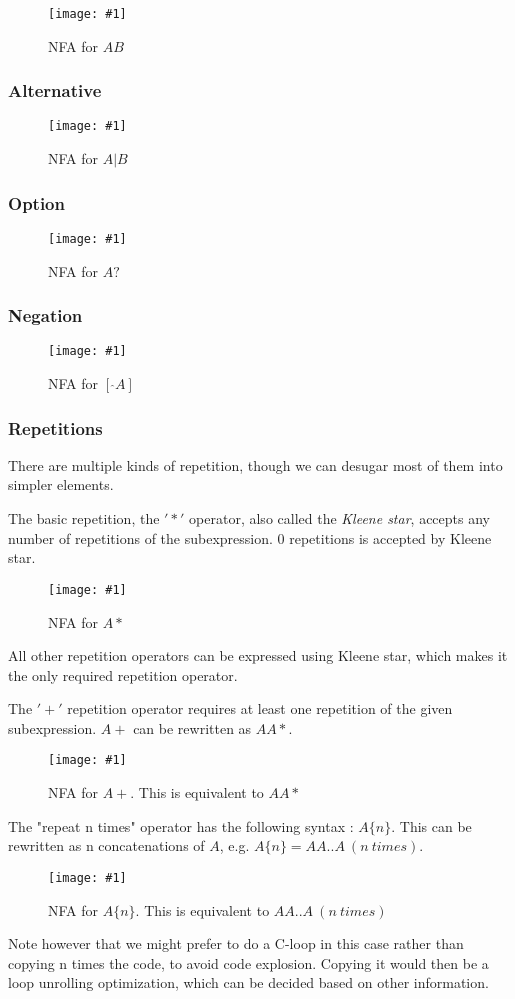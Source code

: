 \documentclass[11pt,a4paper]{report}
\newcommand{\regexp}[1]{$#1$}
\newcommand{\insertfa}[3]{
\begin{figure}[h!]
	\centering
	\texttt{[image: \#1]}
	\caption{#2}
\end{figure}
}
\newcommand{\smallnfa}[2]{\insertfa{./img/nfa/#1.png}{NFA for #2}{scale=0.7}}
\begin{document}
\smallnfa{concat}{\regexp{AB}}

\subsubsection{Alternative}

\smallnfa{alt}{\regexp{A|B}}

\subsubsection{Option}

\smallnfa{option}{\regexp{A?}}

\subsubsection{Negation}

\smallnfa{neg}{\regexp{[\ \hat{} A]}}

\subsubsection{Repetitions}

There are multiple kinds of repetition, though we can desugar most of them into simpler elements.

The basic repetition, the $'*'$ operator, also called the \textit{Kleene star}, accepts any number of repetitions of the subexpression. 0 repetitions is accepted by Kleene star.

\smallnfa{kleene-star}{\regexp{A*}}

All other repetition operators can be expressed using Kleene star, which makes it the only required repetition operator.

The $'+'$ repetition operator requires at least one repetition of the given subexpression. \regexp{A+} can be rewritten as \regexp{AA*}.

\smallnfa{repeat-at-least-once}{\regexp{A+}. This is equivalent to \regexp{AA*}}

The "repeat n times" operator has the following syntax : \regexp{A\{n\}}. This can be rewritten as n concatenations of $A$, e.g. \regexp{A\{n\} = AA..A\ (n\ times)}.

\smallnfa{repeat-n-times}{\regexp{A\{n\}}. This is equivalent to \regexp{AA..A\ (n\ times)}}

Note however that we might prefer to do a C-loop in this case rather than copying n times the code, to avoid code explosion. Copying it would then be a loop unrolling optimization, which can be decided based on other information.
\end{document}
